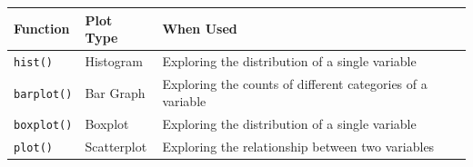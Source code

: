 \documentclass[]{book}
\theoremstyle{definition}
\theoremstyle{definition}
\theoremstyle{definition}
\theoremstyle{remark}
\begin{document}
\begin{longtable}[]{@{}lll@{}}
\toprule
\begin{minipage}[b]{0.14\columnwidth}\raggedright\strut
Function\strut
\end{minipage} & \begin{minipage}[b]{0.14\columnwidth}\raggedright\strut
Plot Type\strut
\end{minipage} & \begin{minipage}[b]{0.63\columnwidth}\raggedright\strut
When Used\strut
\end{minipage}\tabularnewline
\midrule
\endhead
\begin{minipage}[t]{0.14\columnwidth}\raggedright\strut
\texttt{hist()}\strut
\end{minipage} & \begin{minipage}[t]{0.14\columnwidth}\raggedright\strut
Histogram\strut
\end{minipage} & \begin{minipage}[t]{0.63\columnwidth}\raggedright\strut
Exploring the distribution of a single variable\strut
\end{minipage}\tabularnewline
\begin{minipage}[t]{0.14\columnwidth}\raggedright\strut
\texttt{barplot()}\strut
\end{minipage} & \begin{minipage}[t]{0.14\columnwidth}\raggedright\strut
Bar Graph\strut
\end{minipage} & \begin{minipage}[t]{0.63\columnwidth}\raggedright\strut
Exploring the counts of different categories of a variable\strut
\end{minipage}\tabularnewline
\begin{minipage}[t]{0.14\columnwidth}\raggedright\strut
\texttt{boxplot()}\strut
\end{minipage} & \begin{minipage}[t]{0.14\columnwidth}\raggedright\strut
Boxplot\strut
\end{minipage} & \begin{minipage}[t]{0.63\columnwidth}\raggedright\strut
Exploring the distribution of a single variable\strut
\end{minipage}\tabularnewline
\begin{minipage}[t]{0.14\columnwidth}\raggedright\strut
\texttt{plot()}\strut
\end{minipage} & \begin{minipage}[t]{0.14\columnwidth}\raggedright\strut
Scatterplot\strut
\end{minipage} & \begin{minipage}[t]{0.63\columnwidth}\raggedright\strut
Exploring the relationship between two variables\strut
\end{minipage}\tabularnewline
\bottomrule
\end{longtable}
\end{document}
